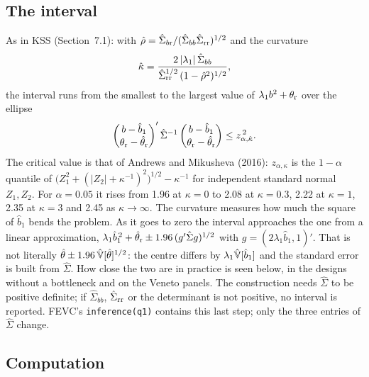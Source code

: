 \subsection{The interval}\label{sec:q1int}

As in KSS (Section~7.1): with $\hat\rho=\hat\Sigma_{b{\rm r}}/(\hat\Sigma_{bb}\hat\Sigma_{\rm rr})^{1/2}$ and the
curvature
\begin{equation}\label{eq:kappa}
\hat\kappa=\frac{2\,|\lambda_1|\,\hat\Sigma_{bb}}{\hat\Sigma_{\rm rr}^{1/2}\,(1-\hat\rho^2)^{1/2}},
\end{equation}
the interval runs from the smallest to the largest value of $\lambda_1b^2+\theta_{\rm r}$ over the ellipse
\[
\begin{pmatrix}b-\hat b_1\\ \theta_{\rm r}-\hat\theta_{\rm r}\end{pmatrix}'\hat\Sigma^{-1}
\begin{pmatrix}b-\hat b_1\\ \theta_{\rm r}-\hat\theta_{\rm r}\end{pmatrix}\le z_{\alpha,\hat\kappa}^{\,2} .
\]
The critical value is that of Andrews and Mikusheva (2016): $z_{\alpha,\kappa}$ is the $1-\alpha$ quantile of
$\big(Z_1^2+(|Z_2|+\kappa^{-1})^2\big)^{1/2}-\kappa^{-1}$ for independent standard normal $Z_1,Z_2$. For
$\alpha=0.05$ it rises from 1.96 at $\kappa=0$ to 2.08 at $\kappa=0.3$, 2.22 at $\kappa=1$, 2.35 at $\kappa=3$ and
2.45 as $\kappa\to\infty$. The curvature measures how much the square of $\hat b_1$ bends the problem. As it
goes to zero the interval approaches the one from a linear approximation,
$\lambda_1\hat b_1^{\,2}+\hat\theta_{\rm r}\pm1.96\,(g'\hat\Sigma g)^{1/2}$ with $g=(2\lambda_1\hat b_1,1)'$. That is
not literally $\hat\theta\pm1.96\,\hat{\mathbb{V}}[\hat\theta]^{1/2}$: the centre differs by $\lambda_1\hat{\mathbb{V}}[\hat b_1]$ and the
standard error is built from $\hat\Sigma$. How close the two are in practice is seen below, in the designs
without a bottleneck and on the Veneto panels. The construction needs $\hat\Sigma$ to be positive definite; if
$\hat\Sigma_{bb}$, $\hat\Sigma_{\rm rr}$ or the determinant is not positive, no interval is reported. FEVC's
\texttt{inference(q1)} contains this last step; only the three entries of $\hat\Sigma$ change.

\subsection{Computation}

